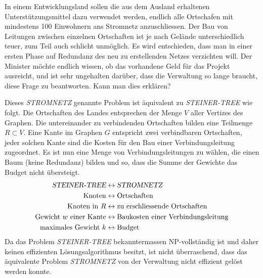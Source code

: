 In einem Entwicklungsland sollen die aus dem Ausland erhaltenen
Unterstützungsmittel dazu verwendet werden, endlich alle Ortschafen
mit mindestens 100 Einwohnern ans Stromnetz anzuschliessen.
Der Bau von Leitungen zwischen einzelnen Ortschaften ist je nach
Gelände unterschiedlich teuer, zum Teil auch schlicht unmöglich.
Es wird entschieden, dass man in einer ersten Phase auf Redundanz des
neu zu erstellenden Netzes verzichten will.
Der Minister möchte endlich wissen,
ob das vorhandene Geld für das Projekt ausreicht, und ist sehr ungehalten
darüber, dass die Verwaltung so lange braucht, diese Frage zu beantworten.
Kann man dies erklären?


\begin{loesung}
Dieses \textsl{STROMNETZ} genannte Problem ist äquivalent zu
\textsl{STEINER-TREE} wie folgt.
Die Ortschaften des Landes entsprechen der Menge $V$ aller Vertizes des
Graphen. Die untereinander zu verbindenden Ortschaften bilden eine Teilmenge
$R\subset V$.
Eine Kante im Graphen $G$ entspricht zwei verbindbaren Ortschaften,
jeder solchen Kante sind die Kosten für den Bau einer Verbindungsleitung
zugeordnet.
Es ist nun eine Menge von Verbindungsleitungen zu wählen, die einen Baum
(keine Redundanz) bilden und so, dass die Summe der Gewichte das 
Budget nicht übersteigt.
\begin{align*}
\textsl{STEINER-TREE}&\leftrightarrow\textsl{STROMNETZ}\\
\text{Knoten}&\leftrightarrow\text{Ortschaften}\\
\text{Knoten in $R$}&\leftrightarrow\text{zu erschliessende Ortschaften}\\
\text{Gewicht $w$ einer Kante}&\leftrightarrow \text{Baukosten einer Verbindungsleitung}\\
\text{maximales Gewicht $k$}&\leftrightarrow\text{Budget}
\end{align*}
Da das Problem \textsl{STEINER-TREE} bekanntermassen NP-vollständig ist
und daher keinen effizienten Lösungsalgorithmus besitzt, ist nicht
überraschend, dass das äquivalente Problem \textsl{STROMNETZ} von
der Verwaltung nicht effizient gelöst werden konnte.
\end{loesung}

